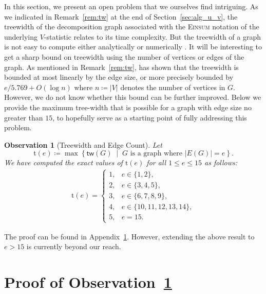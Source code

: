 \documentclass[12pt]{article}
\theoremstyle{plain}
\newtheorem{observation}{Observation}
\theoremstyle{definition}
\def\Einsum{\textsc{Einsum}}
\newcommand{\treewidthp}[1]{\mathsf{tw}(#1)}
\begin{document}
\begin{bibunit}[agsm]
In this section, we present an open problem that we ourselves find intriguing. As we indicated in Remark~\ref{rem:tw} at the end of Section~\ref{sec:alg_u_v}, the treewidth of the decomposition graph associated with the \Einsum{} notation of the underlying $V$-statistic relates to its time complexity. But the treewidth of a graph is not easy to compute either analytically \citep{harvey2018treewidth} or numerically \citep{arnborg1987complexity}. It will be interesting to get a sharp bound on treewidth using the number of vertices or edges of the graph. As mentioned in Remark~\ref{rem:tw}, \citet{kneis2009bound} has shown that the treewidth is bounded at most linearly by the edge size, or more precisely bounded by $e / 5.769 + O (\log n)$ where $n \coloneqq |V|$ denotes the number of vertices in $G$. However, we do not know whether this bound can be further improved. Below we provide the maximum tree-width that is possible for a graph with edge size no greater than $15$, to hopefully serve as a starting point of fully addressing this problem.
\begin{observation}[Treewidth and Edge Count]
\label{pro:treewidth_table}
Let
\begin{equation*}
\mathrm{t}(e) \coloneqq \max \left\{ \treewidthp{G} \;\middle|\; G \text{ is a graph where } |E(G)| = e \right\}.
\end{equation*}
We have computed the exact values of $\mathrm{t} (e)$ for all $1 \le e \le 15$ as follows:
\begin{equation*}
\begin{split}
\mathrm{t} (e) = \left\{ \begin{array}{ll}
1, & e \in \{1, 2\}, \\
2, & e \in \{3, 4, 5\}, \\
3, & e \in \{6, 7, 8, 9\}, \\
4, & e \in \{10, 11, 12, 13, 14\}, \\
5, & e = 15.
\end{array} \right.
\end{split}
\end{equation*}
\end{observation}
The proof can be found in Appendix~\ref{app:treewidtg_table}. However, extending the above result to $e > 15$ is currently beyond our reach.

\section{Proof of Observation~\ref{pro:treewidth_table}}
\label{app:treewidtg_table}



\end{bibunit}
\end{document}
